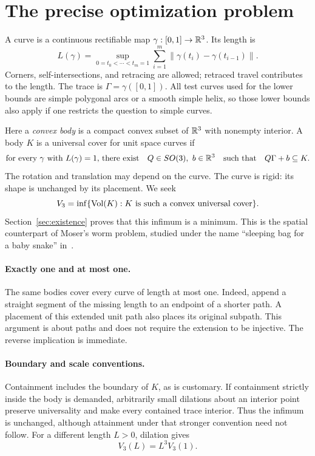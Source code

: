 \section{The precise optimization problem}\label{sec:problem}

A curve is a continuous rectifiable map $\gamma:[0,1]\to\mathbb R^3$.
Its length is
\[
 L(\gamma)=\sup_{0=t_0<\cdots<t_m=1}
 \sum_{i=1}^m\|\gamma(t_i)-\gamma(t_{i-1})\|.
\]
Corners, self-intersections, and retracing are allowed; retraced travel
contributes to the length. The trace is $\Gamma=\gamma([0,1])$.
All test curves used for the lower bounds are simple polygonal arcs or a
smooth simple helix, so those lower bounds also apply if one restricts
the question to simple curves.

Here a \emph{convex body} is a compact convex subset of $\mathbb R^3$ with nonempty
interior. A body $K$ is a universal cover for unit space curves if
\[
 \text{for every $\gamma$ with $L(\gamma)=1$, there exist}
 \quad Q\in SO(3),\ b\in\mathbb R^3
 \quad\text{such that}\quad Q\Gamma+b\subseteq K.
\]
The rotation and translation may depend on the curve. The curve is rigid:
its shape is unchanged by its placement. We seek
\[
 V_3=\inf\{\operatorname{Vol}(K):K\text{ is such a convex universal cover}\}.
\]
Section~\ref{sec:existence} proves that this infimum is a minimum.
This is the spatial counterpart of Moser's worm problem, studied under
the name ``sleeping bag for a baby snake'' in~\cite{HLW2001}.

\paragraph{Exactly one and at most one.}
The same bodies cover every curve of length at most one. Indeed, append
a straight segment of the missing length to an endpoint of a shorter
path. A placement of this extended unit path also places its original
subpath. This argument is about paths and does not require the extension
to be injective. The reverse implication is immediate.

\paragraph{Boundary and scale conventions.}
Containment includes the boundary of $K$, as is customary. If containment
strictly inside the body is demanded, arbitrarily small dilations about
an interior point preserve universality and make every contained trace
interior. Thus the infimum is unchanged, although attainment under that
stronger convention need not follow. For a different length $L>0$,
dilation gives
\[
 V_3(L)=L^3 V_3(1).
\]

